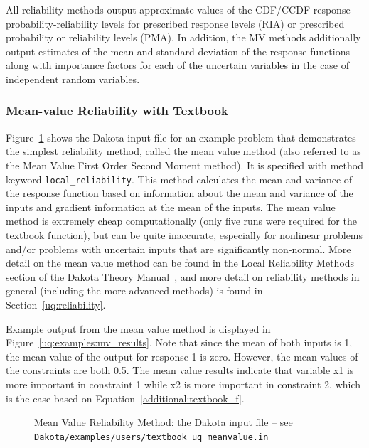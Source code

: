 All reliability methods output approximate values of the CDF/CCDF
response-probability-reliability levels for prescribed response levels
(RIA) or prescribed probability or reliability levels (PMA). In
addition, the MV methods additionally output estimates of the mean and
standard deviation of the response functions along with importance
factors for each of the uncertain variables in the case of independent
random variables.

\subsubsection{Mean-value Reliability with Textbook}
\label{uq:examples:mv}

Figure~\ref{uq:examples:mv_input} shows the Dakota input file for an
example problem that demonstrates the simplest reliability method,
called the mean value method (also referred to as the Mean Value First
Order Second Moment method). It is specified with method keyword
\texttt{local\_reliability}. This method calculates the mean and
variance of the response function based on information about the mean
and variance of the inputs and gradient information at the mean of the
inputs. The mean value method is extremely cheap computationally (only
five runs were required for the textbook function), but can be quite
inaccurate, especially for nonlinear problems and/or problems with
uncertain inputs that are significantly non-normal. More detail on the
mean value method can be found in the Local Reliability Methods
section of the Dakota Theory Manual~\cite{TheoMan}, and more detail on
reliability methods in general (including the more advanced methods)
is found in Section~\ref{uq:reliability}.

Example output from the mean value method is displayed in 
Figure~\ref{uq:examples:mv_results}. Note that since the mean of both inputs
is 1, the mean value of the output for response 1 is zero. 
However, the mean values of the constraints are both 0.5. 
The mean value results indicate that variable x1 is more 
important in constraint 1 while x2 is more important in constraint 2, 
which is the case based on Equation~\ref{additional:textbook_f}.

\begin{figure}[htbp!]
  \centering
  \begin{bigbox}
    \begin{small}
    \end{small}
  \end{bigbox}
  \caption{Mean Value Reliability Method: the Dakota input file --
see \texttt{Dakota/examples/users/textbook\_uq\_meanvalue.in} }
  \label{uq:examples:mv_input}
\end{figure}

